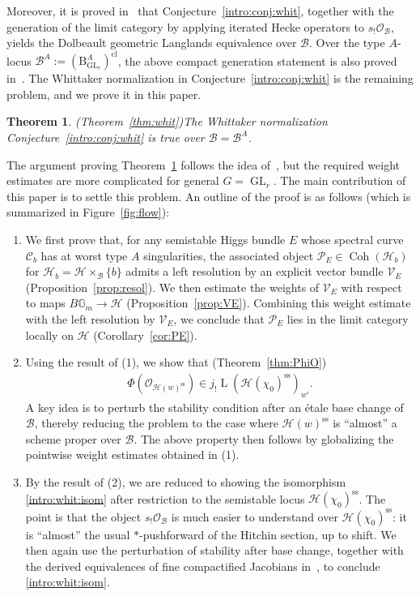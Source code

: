 \documentclass[11pt,oneside,a4paper,mathscr]{amsart}
\newtheorem{thm}{Theorem}[section]
\theoremstyle{definition}
\newcommand{\LL}{\operatorname{L}}
\newcommand{\cH}{\mathcal{H}}
\newcommand{\cB}{\mathcal{B}}
\newcommand{\cC}{\mathcal{C}}
\newcommand{\cP}{\mathcal{P}}
\newcommand{\cO}{\mathcal{O}}
\newcommand{\bgm}{B\mathbb{G}_m}
\newcommand{\rB}{\mathrm{B}}
\newcommand{\Coh}{\operatorname{Coh}}
\newcommand{\GL}{\operatorname{GL}}
\renewcommand{\theenumi}{\roman{enumi}}
\renewcommand{\labelenumi}{(\theenumi)}
\begin{document}
Moreover, it is proved in~\cite[Theorem~4.29]{TodaGL2} that
Conjecture~\ref{intro:conj:whit}, together with the generation of the limit
category by applying iterated Hecke operators to $s_!\cO_{\cB}$, yields the Dolbeault geometric
Langlands equivalence over $\cB$. 
Over the type $A$-locus $\cB^A:=(\rB_{\GL_r}^A)^{\mathrm{cl}}$, the above compact 
generation statement is also proved in~\cite[Corollary~4.28]{TodaGL2}. 
The Whittaker normalization in
Conjecture~\ref{intro:conj:whit} is the remaining problem, and we prove it
in this paper.

\begin{thm}\emph{(Theorem~\ref{thm:whit})}\label{thm:Whit:intro}
The Whittaker normalization Conjecture~\ref{intro:conj:whit} is true over
$\cB=\cB^A$.
\end{thm}

The argument proving Theorem~\ref{thm:Whit:intro} follows the idea of~\cite[Section~5]{TodaGL2},
but the required weight estimates are more complicated for general
$G=\GL_r$. The main contribution of this paper is to settle this problem.
An outline of the proof is as follows
(which is summarized in Figure~\ref{fig:flow}): 

\begin{enumerate}[leftmargin=1.5em]
\renewcommand{\labelenumi}{(\arabic{enumi})}
\item We first prove that, for any semistable Higgs bundle $E$ whose
spectral curve $\cC_b$ has at worst type $A$ singularities, the associated
object $\cP_E \in \Coh(\cH_b)$ 
for $\cH_b=\cH\times_{\cB}\{b\}$
admits a left resolution by an explicit vector bundle $\mathcal{V}_E$
(Proposition~\ref{prop:resol}). We then estimate the weights of
$\mathcal{V}_E$ with respect to maps $\bgm \to \cH$
(Proposition~\ref{prop:VE}). Combining this weight estimate with the
left resolution by $\mathcal{V}_E$, we conclude that $\cP_E$ lies in the
limit category locally on $\cH$ (Corollary~\ref{cor:PE}).

\item Using the result of (1), we show that
(Theorem~\ref{thm:PhiO})
\begin{align*}
    \Phi(\cO_{\cH(w)^{\mathrm{ss}}}) \in
    j_{!} \LL(\cH(\chi_0)^{\mathrm{ss}})_{w'}.
\end{align*}
A key idea is to perturb the stability condition after an \'etale base
change of $\cB$, thereby reducing the problem to the case where
$\cH(w)^{\mathrm{ss}}$ is ``almost'' a scheme proper over $\cB$. The
above property then follows by globalizing the pointwise weight
estimates obtained in (1).

\item By the result of (2), we are reduced to showing the isomorphism
\eqref{intro:whit:isom} after restriction to the semistable locus
$\cH(\chi_0)^{\mathrm{ss}}$. The point is that the object
$s_{!}\cO_{\cB}$ is much easier to understand over
$\cH(\chi_0)^{\mathrm{ss}}$: it is ``almost'' the usual $*$-pushforward of
the Hitchin section, up to shift. We then again use the perturbation of
stability after base change, together with the derived equivalences of
fine compactified Jacobians in~\cite{MRVF2}, to conclude
\eqref{intro:whit:isom}.
\end{enumerate}
\end{document}
